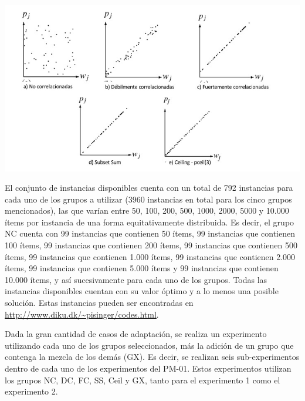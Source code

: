 \begingroup
    \centering
    \includegraphics[width=14cm]{images/cap3/correlaciones.jpg}
    \label{fig:correlaciones}
\endgroup

El conjunto de instancias disponibles cuenta con un total de 792 instancias para cada uno de los grupos a utilizar (3960 instancias en total para los cinco grupos mencionados), las que varían entre 50, 100, 200, 500, 1000, 2000, 5000 y 10.000 ítems por instancia de una forma equitativamente distribuida. Es decir, el grupo NC cuenta con 99 instancias que contienen 50 ítems, 99 instancias que contienen 100 ítems, 99 instancias que contienen 200 ítems, 99 instancias que contienen 500 ítems, 99 instancias que contienen 1.000 ítems, 99 instancias que contienen 2.000 ítems, 99 instancias que contienen 5.000 ítems y 99 instancias que contienen 10.000 ítems, y así sucesivamente para cada uno de los grupos. Todas las instancias disponibles cuentan con su valor óptimo y a lo menos una posible solución. Estas instancias pueden ser encontradas en \url{http://www.diku.dk/~pisinger/codes.html}.

Dada la gran cantidad de casos de adaptación, se realiza un experimento utilizando cada uno de los grupos seleccionados, más la adición de un grupo que contenga la mezcla de los demás (GX). Es decir, se realizan seis sub-experimentos dentro de cada uno de los experimentos del PM-01. Estos experimentos utilizan los grupos NC, DC, FC, SS, Ceil y GX, tanto para el experimento 1 como el experimento 2. 

